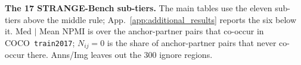 \begin{table}[h!]
\centering\footnotesize
\caption{\textbf{The 17 STRANGE-Bench sub-tiers.} The main tables use the eleven sub-tiers above the middle rule; App.~\ref{app:additional_results} reports the six below it. Med $|$ Mean NPMI is over the anchor-partner pairs that co-occur in COCO~\texttt{train2017}; $N_{ij}{=}0$ is the share of anchor-partner pairs that never co-occur there. Anns/Img leaves out the $300$ ignore regions.}
\label{tab:strange_tiers}
\resizebox{\linewidth}{!}{%

}
\end{table}
